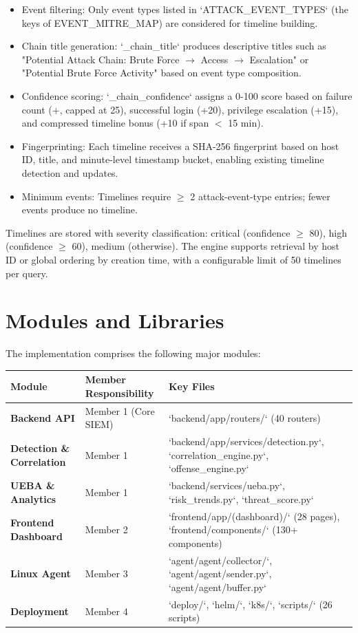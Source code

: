 \begin{itemize}
    \item Event filtering: Only event types listed in `ATTACK_EVENT_TYPES` (the keys of EVENT\_MITRE\_MAP) are considered for timeline building.
    \item Chain title generation: `_chain_title` produces descriptive titles such as "Potential Attack Chain: Brute Force $\rightarrow$ Access $\rightarrow$ Escalation" or "Potential Brute Force Activity" based on event type composition.
    \item Confidence scoring: `_chain_confidence` assigns a 0-100 score based on failure count (+, capped at 25), successful login (+20), privilege escalation (+15), and compressed timeline bonus (+10 if span $<$ 15 min).
    \item Fingerprinting: Each timeline receives a SHA-256 fingerprint based on host ID, title, and minute-level timestamp bucket, enabling existing timeline detection and updates.
    \item Minimum events: Timelines require $\ge$ 2 attack-event-type entries; fewer events produce no timeline.
\end{itemize}

Timelines are stored with severity classification: critical (confidence $\ge$ 80), high (confidence $\ge$ 60), medium (otherwise). The engine supports retrieval by host ID or global ordering by creation time, with a configurable limit of 50 timelines per query.

\section{Modules and Libraries}

The implementation comprises the following major modules:

\begin{longtable}{|l|l|l|}
\hline
\textbf{Module} & \textbf{Member Responsibility} & \textbf{Key Files} \\
\hline
\textbf{Backend API} & Member 1 (Core SIEM) & `backend/app/routers/` (40 routers) \\
\hline
\textbf{Detection \& Correlation} & Member 1 & `backend/app/services/detection.py`, `correlation_engine.py`, `offense_engine.py` \\
\hline
\textbf{UEBA \& Analytics} & Member 1 & `backend/services/ueba.py`, `risk_trends.py`, `threat_score.py` \\
\hline
\textbf{Frontend Dashboard} & Member 2 & `frontend/app/(dashboard)/` (28 pages), `frontend/components/` (130+ components) \\
\hline
\textbf{Linux Agent} & Member 3 & `agent/agent/collector/`, `agent/agent/sender.py`, `agent/agent/buffer.py` \\
\hline
\textbf{Deployment} & Member 4 & `deploy/`, `helm/`, `k8s/`, `scripts/` (26 scripts) \\
\hline
\end{longtable}

